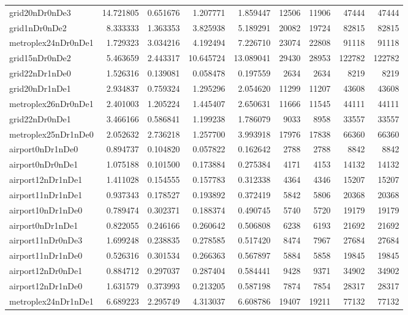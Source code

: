 \begin{longtable}{|l|r|r|r|r|r|r|r|r|}
grid20nDr0nDe3 & 14.721805 & 0.651676 & 1.207771 & 1.859447 & 12506 & 11906 & 47444 & 47444 \\
grid1nDr0nDe2 & 8.333333 & 1.363353 & 3.825938 & 5.189291 & 20082 & 19724 & 82815 & 82815 \\
metroplex24nDr0nDe1 & 1.729323 & 3.034216 & 4.192494 & 7.226710 & 23074 & 22808 & 91118 & 91118 \\
grid15nDr0nDe2 & 5.463659 & 2.443317 & 10.645724 & 13.089041 & 29430 & 28953 & 122782 & 122782 \\
grid22nDr1nDe0 & 1.526316 & 0.139081 & 0.058478 & 0.197559 & 2634 & 2634 & 8219 & 8219 \\
grid20nDr1nDe1 & 2.934837 & 0.759324 & 1.295296 & 2.054620 & 11299 & 11207 & 43608 & 43608 \\
metroplex26nDr0nDe1 & 2.401003 & 1.205224 & 1.445407 & 2.650631 & 11666 & 11545 & 44111 & 44111 \\
grid22nDr0nDe1 & 3.466166 & 0.586841 & 1.199238 & 1.786079 & 9033 & 8958 & 33557 & 33557 \\
metroplex25nDr1nDe0 & 2.052632 & 2.736218 & 1.257700 & 3.993918 & 17976 & 17838 & 66360 & 66360 \\
airport0nDr1nDe0 & 0.894737 & 0.104820 & 0.057822 & 0.162642 & 2788 & 2788 & 8842 & 8842 \\
airport0nDr0nDe1 & 1.075188 & 0.101500 & 0.173884 & 0.275384 & 4171 & 4153 & 14132 & 14132 \\
airport12nDr1nDe1 & 1.411028 & 0.154555 & 0.157783 & 0.312338 & 4364 & 4346 & 15207 & 15207 \\
airport11nDr1nDe1 & 0.937343 & 0.178527 & 0.193892 & 0.372419 & 5842 & 5806 & 20368 & 20368 \\
airport10nDr1nDe0 & 0.789474 & 0.302371 & 0.188374 & 0.490745 & 5740 & 5720 & 19179 & 19179 \\
airport0nDr1nDe1 & 0.822055 & 0.246166 & 0.260642 & 0.506808 & 6238 & 6193 & 21692 & 21692 \\
airport11nDr0nDe3 & 1.699248 & 0.238835 & 0.278585 & 0.517420 & 8474 & 7967 & 27684 & 27684 \\
airport11nDr1nDe0 & 0.526316 & 0.301534 & 0.266363 & 0.567897 & 5884 & 5858 & 19845 & 19845 \\
airport12nDr0nDe1 & 0.884712 & 0.297037 & 0.287404 & 0.584441 & 9428 & 9371 & 34902 & 34902 \\
airport12nDr1nDe0 & 1.631579 & 0.373993 & 0.213205 & 0.587198 & 7874 & 7854 & 28317 & 28317 \\
metroplex24nDr1nDe1 & 6.689223 & 2.295749 & 4.313037 & 6.608786 & 19407 & 19211 & 77132 & 77132 \\

\end{longtable}
